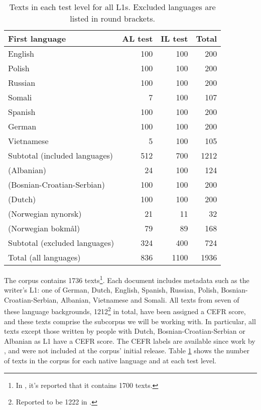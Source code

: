 \begin{table}
  \centering
  \begin{tabular}{lrrr}
    \toprule
    First language             & AL test & IL test & Total \\
    \midrule
    English                    &     100 &     100 &   200 \\
    Polish                     &     100 &     100 &   200 \\
    Russian                    &     100 &     100 &   200 \\
    Somali                     &       7 &     100 &   107 \\
    Spanish                    &     100 &     100 &   200 \\
    German                     &     100 &     100 &   200 \\
    Vietnamese                 &       5 &     100 &   105 \\
    \midrule
    Subtotal (included languages) &  512 &     700 &  1212 \\ \addlinespace
    \midrule
    (Albanian)                 &      24 &     100 &   124 \\
    (Bosnian-Croatian-Serbian) &     100 &     100 &   200 \\
    (Dutch)                    &     100 &     100 &   200 \\
    (Norwegian nynorsk)        &      21 &      11 &    32 \\
    (Norwegian bokmål)         &      79 &      89 &   168 \\
    \midrule
    Subtotal (excluded languages) &  324 &     400 &   724 \\ \addlinespace
    \midrule
    Total (all languages)      &     836 &    1100 &  1936 \\
    \bottomrule
  \end{tabular}
  \caption{Texts in each test level for all \acp{L1}.
           Excluded languages are listed in round brackets.}
  \label{tab:l1-and-testlevel}
\end{table}

The corpus contains 1736 texts\footnote{In
\textcite{carlsen2012proficiency,malmasi15,malmasi17}, it's reported that it
contains 1700 texts.}. Each document includes metadata such as the writer's
L1: one of German, Dutch, English, Spanish, Russian, Polish,
Bosnian-Croatian-Serbian, Albanian, Vietnamese and Somali. All texts from
seven of these language backgrounds, 1212\footnote{Reported to be 1222 in
\textcite{carlsen2012proficiency}.} in total, have been assigned a \ac{CEFR}
score, and these texts comprise the subcorpus we will be working with. In
particular, all texts except those written by people with Dutch,
Bosnian-Croatian-Serbian or Albanian as L1 have a CEFR score. The CEFR labels
are available since work by \textcite{carlsen2012proficiency}, and were not
included at the corpus' initial release. Table \ref{tab:l1-and-testlevel}
shows the number of texts in the corpus for each native language and at each
test level.

